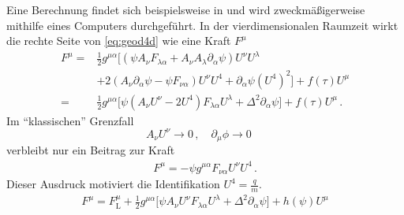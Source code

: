 Eine Berechnung findet sich beispielsweise in \cite{williams2015field} und wird
zweckmäßigerweise mithilfe eines Computers durchgeführt. In der
vierdimensionalen Raumzeit wirkt die  rechte Seite von
\eqref{eq:geod4d} wie eine Kraft $F^\mu$ 
\begin{equation}
\begin{split}
F^\mu=&\frac{1}{2}g^{\mu\alpha}\Bigg[\left(\psi
A_{\nu}F_{\lambda\alpha}+A_{\nu}A_{\lambda}\partial_{\alpha}\psi
\right)U^\nu U^\lambda\\
&+2\left(A_\nu\partial_\alpha\psi-\psi F_{\nu\alpha}\right)U^\nu
U^4+\partial_{\alpha}\psi \left(U^4\right)^2\Bigg]+f(\tau)U^\mu\\
=&\frac{1}{2}g^{\mu\alpha}\Bigg[\psi
(A_\nu U^\nu-2U^4) F_{\lambda\alpha}U^\lambda +
\Delta ^2\partial_\alpha\psi\Bigg]+f(\tau)U^\mu\,.
\end{split}
\end{equation}
Im \enquote{klassischen} Grenzfall
\begin{equation}
A_\nu U^\nu\to 0\,,\quad
\partial_\mu\phi\to 0\,\quad
\end{equation}
verbleibt nur ein Beitrag zur Kraft
\begin{equation}
\begin{split}
F^\mu=-\psi g^{\mu\alpha}F_{\nu\alpha}U^\nu U^4\,.
\end{split}
\end{equation}
Dieser Ausdruck motiviert die Identifikation $U^4=\frac{q}{m}$.
\begin{equation}
\begin{split}
F^\mu=F^\mu_{\text{L}}+\frac{1}{2}g^{\mu\alpha}\Bigg[\psi A_\nu
U^\nu F_{\lambda\alpha}U^\lambda + \Delta
^2\partial_\alpha\psi\Bigg]+h(\psi)U^\mu
\end{split}
\end{equation}
